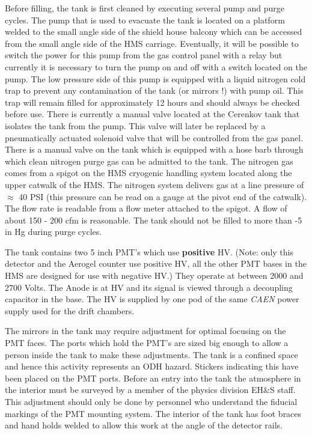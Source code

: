 {Before filling, the tank is first cleaned by executing several pump
and purge cycles. The pump that is used to evacuate the tank is located on a
platform welded to the small angle side of the shield house balcony
which can be accessed from the small angle side of the HMS carriage.
Eventually, it will be possible to switch the power for this pump
from the gas control panel with a relay but currently it
is necessary to turn the pump on and off with a switch located on the pump.
The low pressure side of this pump is equipped with a liquid nitrogen
cold trap to prevent any contamination of the tank (or mirrors !)
with pump oil. This trap will remain filled for approximately
12 hours and should always be checked before use. There is currently
a manual valve located at the Cerenkov tank that isolates the tank from
the pump.  This valve will later be replaced by a pneumatically actuated
solenoid valve that will be controlled from the gas panel.
There is a manual valve on the tank which is equipped with a hose
barb through which clean nitrogen purge gas can be admitted to the tank.
The nitrogen gas comes from a spigot on the HMS cryogenic handling system
located along the upper catwalk of the HMS. The nitrogen system
delivers gas at a line pressure of $\approx$ 40 PSI (this pressure can
be read on a gauge at the pivot end of the catwalk). The flow
rate is readable from a flow meter attached to the spigot. A flow of
about 150 - 200 cfm is reasonable. The tank should not be filled to
more than -5 in Hg during purge cycles.

The tank contains two 5 inch PMT's which use {\bf positive} HV.
(Note: only this detector and the Aerogel counter use positive HV, all the other PMT bases in the HMS are designed for use with
negative HV.) They operate
at between 2000 and 2700 Volts. The Anode is at HV and its signal is
viewed through a decoupling capacitor in the base. The HV is supplied
by one pod of the same {\em CAEN} power supply used for the drift chambers.

The mirrors in the tank may require adjustment for optimal focusing
on the PMT faces. The ports which hold the PMT's are sized big enough to allow
a person inside the tank to make these adjustments. The tank is a confined
space and hence this activity represents an ODH hazard. Stickers indicating
this have been placed on the PMT ports. Before an entry into the tank the
atmosphere in the interior must be surveyed by a member of the physics
division EH$\&$S staff.
This adjustment should only
be done by personnel who understand the fiducial markings of the PMT
mounting system. The interior of the tank has foot braces and hand holds welded
to allow this work at the angle of the detector rails.

}
